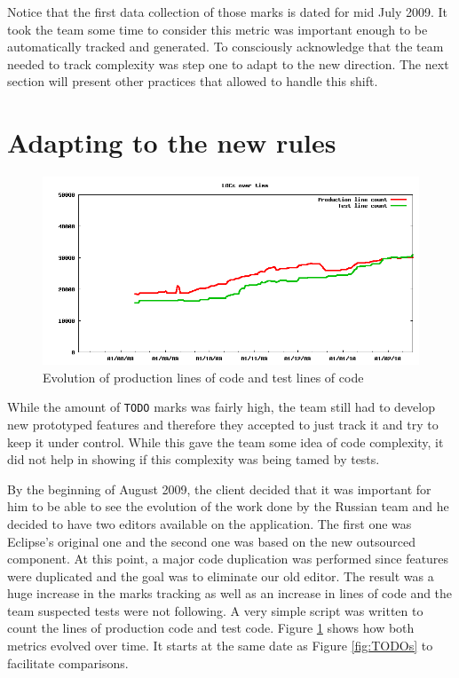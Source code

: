 \documentclass[lnbip]{svmultln}
\begin{document}
Notice that the first data collection of those marks is dated for mid
July 2009. It took the team some time to consider this metric was
important enough to be automatically tracked and generated. To
consciously acknowledge that the team needed to track complexity was
step one to adapt to the new direction. The next section will present
other practices that allowed to handle this shift.

\section{Adapting to the new rules}
\label{sec:adapting}

\begin{figure}[hbt]
  \centerline{
    \includegraphics[width=120mm]{LOCs.png}
  }
  \caption{Evolution of production lines of code and test lines of
    code}
  \label{fig:LOCs}
\end{figure}

While the amount of \texttt{TODO} marks was fairly high, the team
still had to develop new prototyped features and therefore they
accepted to just track it and try to keep it under control. While this
gave the team some idea of code complexity, it did not help in showing
if this complexity was being tamed by tests.

By the beginning of August 2009, the client decided that it was
important for him to be able to see the evolution of the work done by
the Russian team and he decided to have two editors available on the
application. The first one was Eclipse's original one and the second
one was based on the new outsourced component. At this point, a major
code duplication was performed since features were duplicated and the
goal was to eliminate our old editor. The result was a huge increase
in the marks tracking as well as an increase in lines of code and the
team suspected tests were not following. A very simple script was
written to count the lines of production code and test code. Figure
\ref{fig:LOCs} shows how both metrics evolved over time. It starts at
the same date as Figure \ref{fig:TODOs} to facilitate comparisons.
\end{document}
